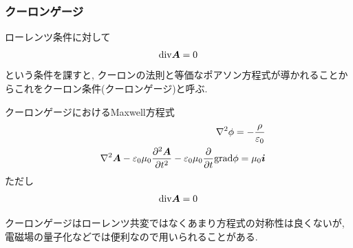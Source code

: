 \documentclass[10.5pt,a4paper]{jreport}
\begin{document}
\subsubsection{クーロンゲージ}
ローレンツ条件に対して
\begin{eqnarray}
  {\rm div}\bm{A} = 0
\end{eqnarray}
という条件を課すと, クーロンの法則と等価なポアソン方程式が導かれることからこれをクーロン条件(クーロンゲージ)と呼ぶ.
\begin{itembox}[c]{クーロンゲージにおけるMaxwell方程式}
  \begin{eqnarray}
    \nonumber   && \nabla^2\phi = -\frac{\rho}{\varepsilon_0}\\
    \nonumber    &&\nabla^2\bm{A} -\varepsilon_0\mu_0\frac{\partial^2 \bm{A}}{\partial t^2} - \varepsilon_0\mu_0\frac{\partial}{\partial t}{\rm grad}\phi = \mu_0\bm{i}
  \end{eqnarray}
  ただし
  \begin{eqnarray}
    \nonumber    {\rm div}\bm{A} = 0
  \end{eqnarray}
\end{itembox}
クーロンゲージはローレンツ共変ではなくあまり方程式の対称性は良くないが, 電磁場の量子化などでは便利なので用いられることがある.
\end{document}
